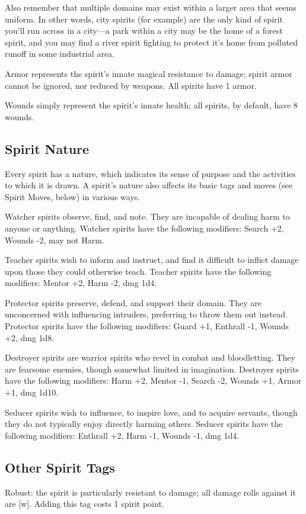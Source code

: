 Also remember that multiple domains may exist within a larger area that seems uniform. In other words, city spirits (for example) are the only kind of spirit you’ll run across in a city—a park within a city may be the home of a forest spirit, and you may find a river spirit fighting to protect it’s home from polluted runoff in some industrial area.

Armor represents the spirit’s innate magical resistance to damage; spirit armor cannot be ignored, nor reduced by weapons. All spirits have 1 armor.

Wounds simply represent the spirit’s innate health; all spirits, by default, have 8 wounds.


\subsection{Spirit Nature}
Every spirit has a nature, which indicates its sense of purpose and the activities to which it is drawn. A spirit’s nature also affects its basic tags and moves (see Spirit Moves, below) in various ways.

Watcher spirits observe, find, and note. They are incapable of dealing harm to anyone or anything. Watcher spirits have the following modifiers: Search +2, Wounds -2, may not Harm.

Teacher spirits wish to inform and instruct, and find it difficult to inflict damage upon those they could otherwise teach. Teacher spirits have the following modifiers: Mentor +2, Harm -2, dmg 1d4.

Protector spirits preserve, defend, and support their domain. They are unconcerned with influencing intruders, preferring to throw them out instead. Protector spirits have the following modifiers: Guard +1, Enthrall -1, Wounds +2, dmg 1d8.

Destroyer spirits are warrior spirits who revel in combat and bloodletting. They are fearsome enemies, though somewhat limited in imagination. Destroyer spirits have the following modifiers: Harm +2, Mentor -1, Search -2, Wounds +1, Armor +1, dmg 1d10.

Seducer spirits wish to influence, to inspire love, and to acquire servants, though they do not typically enjoy directly harming others. Seducer spirits have the following modifiers: Enthrall +2, Harm -1, Wounds -1, dmg 1d4.


\subsection{Other Spirit Tags}
Robust: the spirit is particularly resistant to damage; all damage rolls against it are [w]. Adding this tag costs 1 spirit point.

